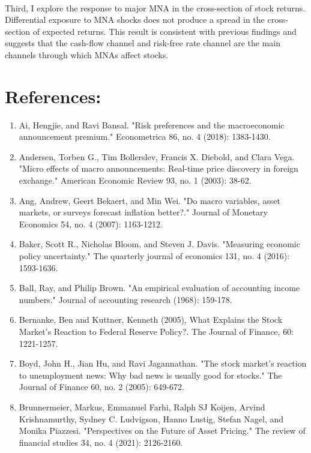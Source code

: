 \documentclass[12pt]{article}
\begin{document}
\paragraph{}
Third, I explore the response to major MNA in the cross-section of stock returns. Differential exposure to MNA shocks does not produce a spread in the cross-section of expected returns. This result is consistent with previous findings and suggests that the cash-flow channel and risk-free rate channel are the main channels through which MNAs affect stocks.



\pagebreak

\section{References:}
\begin{enumerate}
    \item{Ai, Hengjie, and Ravi Bansal. "Risk preferences and the macroeconomic announcement premium." Econometrica 86, no. 4 (2018): 1383-1430.}
    \item{Andersen, Torben G., Tim Bollerslev, Francis X. Diebold, and Clara Vega. "Micro effects of macro announcements: Real-time price discovery in foreign exchange." American Economic Review 93, no. 1 (2003): 38-62.}
    \item{Ang, Andrew, Geert Bekaert, and Min Wei. "Do macro variables, asset markets, or surveys forecast inflation better?." Journal of Monetary Economics 54, no. 4 (2007): 1163-1212.}
    \item{Baker, Scott R., Nicholas Bloom, and Steven J. Davis. "Measuring economic policy uncertainty." The quarterly journal of economics 131, no. 4 (2016): 1593-1636.}
    \item{Ball, Ray, and Philip Brown. "An empirical evaluation of accounting income numbers." Journal of accounting research (1968): 159-178.}
    \item{Bernanke, Ben and Kuttner, Kenneth (2005), What Explains the Stock Market's Reaction to Federal Reserve Policy?. The Journal of Finance, 60: 1221-1257.}
    \item{Boyd, John H., Jian Hu, and Ravi Jagannathan. "The stock market's reaction to unemployment news: Why bad news is usually good for stocks." The Journal of Finance 60, no. 2 (2005): 649-672.}
    \item{Brunnermeier, Markus, Emmanuel Farhi, Ralph SJ Koijen, Arvind Krishnamurthy, Sydney C. Ludvigson, Hanno Lustig, Stefan Nagel, and Monika Piazzesi. "Perspectives on the Future of Asset Pricing." The review of financial studies 34, no. 4 (2021): 2126-2160.}

\end{enumerate}
\end{document}

